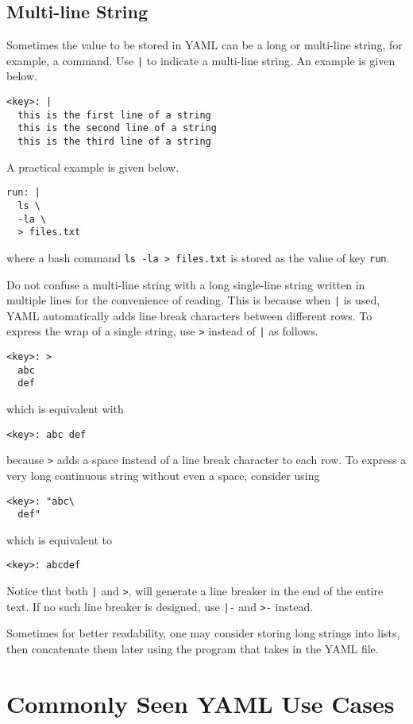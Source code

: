 \subsection{Multi-line String}

Sometimes the value to be stored in YAML can be a long or multi-line string, for example, a command. Use \texttt{|} to indicate a multi-line string. An example is given below.
\begin{lstlisting}
<key>: |
  this is the first line of a string
  this is the second line of a string
  this is the third line of a string
\end{lstlisting}
A practical example is given below.
\begin{lstlisting}
run: |
  ls \
  -la \
  > files.txt
\end{lstlisting}
where a bash command \verb|ls -la > files.txt| is stored as the value of key \verb|run|.

Do not confuse a multi-line string with a long single-line string written in multiple lines for the convenience of reading. This is because when \texttt{|} is used, YAML automatically adds line break characters between different rows. To express the wrap of a single string, use \verb|>| instead of \texttt{|} as follows.
\begin{lstlisting}
<key>: >
  abc
  def
\end{lstlisting}
which is equivalent with
\begin{lstlisting}
<key>: abc def
\end{lstlisting}
because \verb|>| adds a space instead of a line break character to each row. To express a very long continuous string without even a space, consider using
\begin{lstlisting}
<key>: "abc\
  def"
\end{lstlisting}
which is equivalent to
\begin{lstlisting}
<key>: abcdef
\end{lstlisting}

Notice that both \texttt{|} and \verb|>|, will generate a line breaker in the end of the entire text. If no such line breaker is designed, use \texttt{|-} and \verb|>-| instead.

Sometimes for better readability, one may consider storing long strings into lists, then concatenate them later using the program that takes in the YAML file.

\section{Commonly Seen YAML Use Cases}

